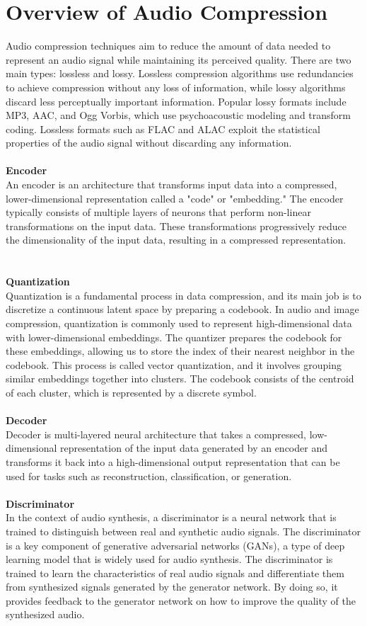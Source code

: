 \documentclass[12pt]{report}
\begin{document}
\section{Overview of Audio Compression}
Audio compression techniques aim to reduce the amount of data needed to represent an audio signal while maintaining its perceived quality. There are two main types: lossless and lossy. Lossless compression algorithms use redundancies to achieve compression without any loss of information, while lossy algorithms discard less perceptually important information. Popular lossy formats include MP3, AAC, and Ogg Vorbis, which use psychoacoustic modeling and transform coding. Lossless formats such as FLAC and ALAC exploit the statistical properties of the audio signal without discarding any information. \\\\
\textbf{Encoder}\\
An encoder is an architecture that transforms input data into a compressed, lower-dimensional representation called a "code" or "embedding."  The encoder typically consists of multiple layers of neurons that perform non-linear transformations on the input data. These transformations progressively reduce the dimensionality of the input data, resulting in a compressed representation. \\\\\\
\textbf{Quantization}\\
Quantization is a fundamental process in data compression, and its main job is to discretize a continuous latent space by preparing a codebook. In audio and image compression, quantization is commonly used to represent high-dimensional data with lower-dimensional embeddings. The quantizer prepares the codebook for these embeddings, allowing us to store the index of their nearest neighbor in the codebook. This process is called vector quantization, and it involves grouping similar embeddings together into clusters. The codebook consists of the centroid of each cluster, which is represented by a discrete symbol. \\\\
\textbf{Decoder}\\
Decoder is multi-layered neural architecture that takes a compressed, low-dimensional representation of the input data  generated by an encoder and transforms it back into a high-dimensional output representation that can be used for tasks such as reconstruction, classification, or generation. \\\\
\textbf{Discriminator}\\
In the context of audio synthesis, a discriminator is a neural network that is trained to distinguish between real and synthetic audio signals. The discriminator is a key component of generative adversarial networks (GANs), a type of deep learning model that is widely used for audio synthesis. The discriminator is trained to learn the characteristics of real audio signals and differentiate them from synthesized signals generated by the generator network. By doing so, it provides feedback to the generator network on how to improve the quality of the synthesized audio. 
\end{document}
